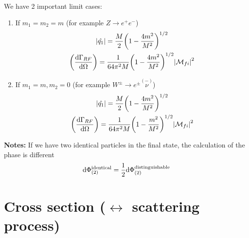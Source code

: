 \documentclass[TheoreticalPhy_ModB.tex]{subfiles}
\begin{document}
\begin{example}[1 $\to$ 2 decay]
We have 2 important limit cases:
\begin{enumerate}[label=(\Alph*)]
\item If $m_1 = m_2 = m$ (for example $Z \to e^+ e^-$)
	\begin{gather}
	\abs{\hat{q_1}} = \frac{M}{2} \biggl( 1 - \frac{4 m^2}{M^2} \biggr)^{1/2} \notag \\
	\biggl( \frac{\textup{d} \Gamma_{RF}}{\textup{d} \Omega} \biggr) = \frac{1}{64 \pi^2 M} \biggl( 1 - \frac{4 m^2}{M^2} \biggl)^{1/2} \abs{\mathcal{M}_{fi}}^2 \notag
	\end{gather}
\item If $m_1 = m, m_2 = 0$ (for example $W^{\pm} \to e^{\pm} \stackrel{(-)}{\nu}$)
	\begin{gather}
	\abs{\hat{q_1}} = \frac{M}{2} \biggl( 1 - \frac{4 m^2}{M^2} \biggr)^{1/2} \notag \\
	\biggl( \frac{\textup{d} \Gamma_{RF}}{\textup{d} \Omega} \biggr) = \frac{1}{64 \pi^2 M} \biggl( 1 - \frac{m^2}{M^2} \biggr)^{1/2} \abs{\mathcal{M}_{fi}}^2 \notag
	\end{gather}
\end{enumerate}
\textbf{Notes:} If we have two identical particles in the final state, the calculation of the phase is different
\[
\textup{d} \Phi_{(2)}^{\textup{identical}} = \frac{1}{2} \textup{d} \Phi_{(2)}^{\textup{distinguishable}}
\]
\end{example}

\section{Cross section ($\leftrightarrow$ scattering process)}
\end{document}
